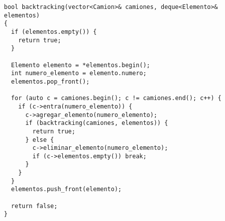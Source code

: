 \documentclass[a4paper]{article}
\begin{document}
\newpage

\begin{lstlisting}
bool backtracking(vector<Camion>& camiones, deque<Elemento>& elementos)
{
  if (elementos.empty()) {
    return true;
  }

  Elemento elemento = *elementos.begin();
  int numero_elemento = elemento.numero;
  elementos.pop_front();

  for (auto c = camiones.begin(); c != camiones.end(); c++) {
    if (c->entra(numero_elemento)) {
      c->agregar_elemento(numero_elemento);
      if (backtracking(camiones, elementos)) {
        return true;
      } else {
        c->eliminar_elemento(numero_elemento);
        if (c->elementos.empty()) break;
      }
    }
  }
  elementos.push_front(elemento);

  return false;
}
\end{lstlisting}
\end{document}
